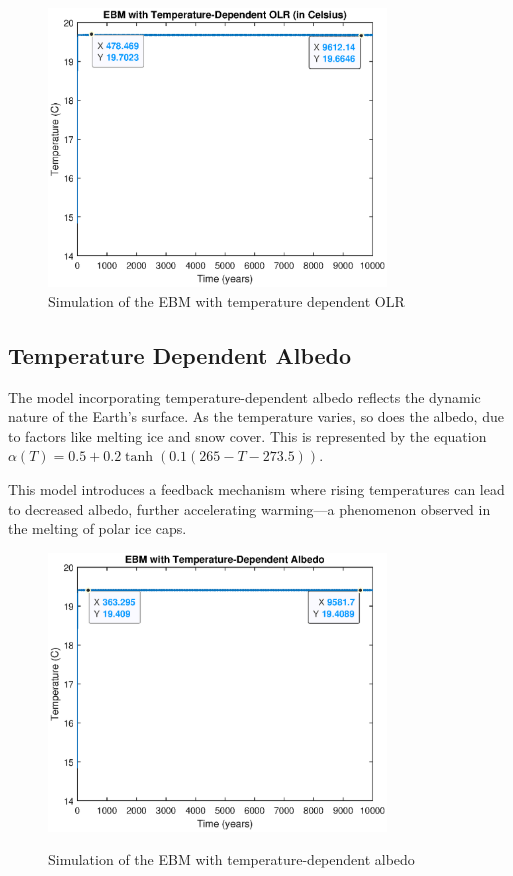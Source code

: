 \documentclass[12pt]{article}
\begin{document}
\begin{figure}[H]
    \centering
    \includegraphics[width=0.8\textwidth]{images/temperature_dependent_olr.eps}
    \caption{Simulation of the EBM with temperature dependent OLR}
    \label{fig:ebm_temperature_olr}
\end{figure}

\subsection{Temperature Dependent Albedo}
The model incorporating temperature-dependent albedo reflects the dynamic nature of the Earth's surface. As the temperature varies, so does the albedo,
due to factors like melting ice and snow cover\cite{kaper-2013-math-ac-albedo}. This is represented by the equation \( \alpha(T) = 0.5 + 0.2 \tanh(0.1(265 - T - 273.5)) \).

This model introduces a feedback mechanism where rising temperatures can lead to decreased albedo, further accelerating warming—a phenomenon observed in the melting of polar ice caps.

\begin{figure}[H]
    \centering
    \includegraphics[width=0.8\textwidth]{images/temperature_dependent_albedo.eps}
    \label{fig:ebm_temperature_albedo}
    \caption{Simulation of the EBM with temperature-dependent albedo}
\end{figure}
\end{document}
